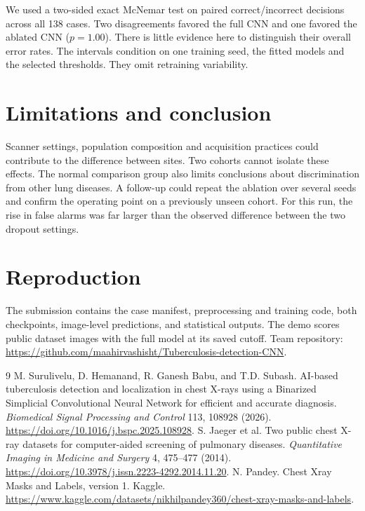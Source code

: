 \documentclass[11pt]{article}
\begin{document}
We used a two-sided exact McNemar test on paired correct/incorrect decisions across all 138 cases. Two disagreements favored the full CNN and one favored the ablated CNN ($p=1.00$). There is little evidence here to distinguish their overall error rates. The intervals condition on one training seed, the fitted models and the selected thresholds. They omit retraining variability.

\section{Limitations and conclusion}
Scanner settings, population composition and acquisition practices could contribute to the difference between sites. Two cohorts cannot isolate these effects. The normal comparison group also limits conclusions about discrimination from other lung diseases. A follow-up could repeat the ablation over several seeds and confirm the operating point on a previously unseen cohort. For this run, the rise in false alarms was far larger than the observed difference between the two dropout settings.

\section*{Reproduction}
The submission contains the case manifest, preprocessing and training code, both checkpoints, image-level predictions, and statistical outputs. The demo scores public dataset images with the full model at its saved cutoff. Team repository: \url{https://github.com/maahirvashisht/Tuberculosis-detection-CNN}.

\begin{thebibliography}{9}
 M. Surulivelu, D. Hemanand, R. Ganesh Babu, and T.D. Subash. AI-based tuberculosis detection and localization in chest X-rays using a Binarized Simplicial Convolutional Neural Network for efficient and accurate diagnosis. \textit{Biomedical Signal Processing and Control} 113, 108928 (2026). \url{https://doi.org/10.1016/j.bspc.2025.108928}.
 S. Jaeger et al. Two public chest X-ray datasets for computer-aided screening of pulmonary diseases. \textit{Quantitative Imaging in Medicine and Surgery} 4, 475--477 (2014). \url{https://doi.org/10.3978/j.issn.2223-4292.2014.11.20}.
 N. Pandey. Chest Xray Masks and Labels, version 1. Kaggle. \url{https://www.kaggle.com/datasets/nikhilpandey360/chest-xray-masks-and-labels}.
\end{thebibliography}
\end{document}
